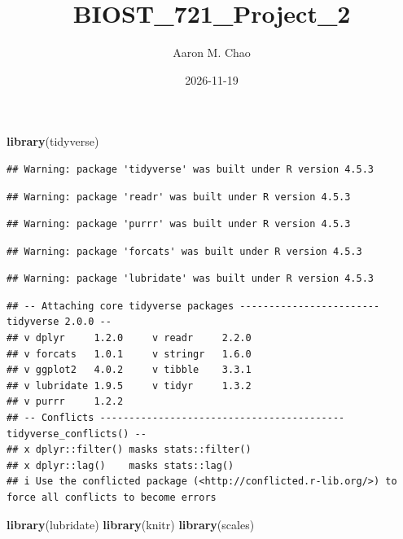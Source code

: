 \documentclass[
]{article}
\title{BIOST\_721\_Project\_2}
\author{Aaron M. Chao}
\date{2026-11-19}
\newenvironment{Shaded}{\begin{snugshade}}{\end{snugshade}}
\newcommand{\FunctionTok}[1]{\textcolor[rgb]{0.13,0.29,0.53}{\textbf{#1}}}
\newcommand{\NormalTok}[1]{#1}
\begin{document}
\maketitle

\begin{Shaded}
\begin{Highlighting}[]
\FunctionTok{library}\NormalTok{(tidyverse)}
\end{Highlighting}
\end{Shaded}

\begin{verbatim}
## Warning: package 'tidyverse' was built under R version 4.5.3
\end{verbatim}

\begin{verbatim}
## Warning: package 'readr' was built under R version 4.5.3
\end{verbatim}

\begin{verbatim}
## Warning: package 'purrr' was built under R version 4.5.3
\end{verbatim}

\begin{verbatim}
## Warning: package 'forcats' was built under R version 4.5.3
\end{verbatim}

\begin{verbatim}
## Warning: package 'lubridate' was built under R version 4.5.3
\end{verbatim}

\begin{verbatim}
## -- Attaching core tidyverse packages ------------------------ tidyverse 2.0.0 --
## v dplyr     1.2.0     v readr     2.2.0
## v forcats   1.0.1     v stringr   1.6.0
## v ggplot2   4.0.2     v tibble    3.3.1
## v lubridate 1.9.5     v tidyr     1.3.2
## v purrr     1.2.2     
## -- Conflicts ------------------------------------------ tidyverse_conflicts() --
## x dplyr::filter() masks stats::filter()
## x dplyr::lag()    masks stats::lag()
## i Use the conflicted package (<http://conflicted.r-lib.org/>) to force all conflicts to become errors
\end{verbatim}

\begin{Shaded}
\begin{Highlighting}[]
\FunctionTok{library}\NormalTok{(lubridate)}
\FunctionTok{library}\NormalTok{(knitr)}
\FunctionTok{library}\NormalTok{(scales)}
\end{Highlighting}
\end{Shaded}
\end{document}
